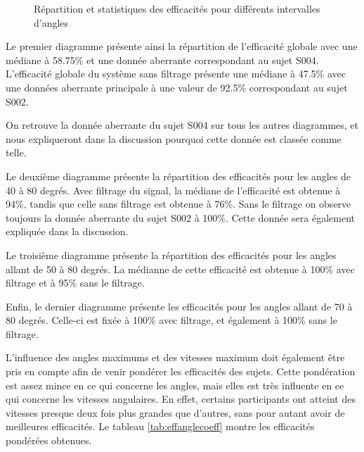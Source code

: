 \documentclass[letterpaper, twoside, 12pt, memoire, creativecommons, hyperref]{thETS}
\begin{document}
\begin{figure}
	\centering
	\caption{Répartition et statistiques des efficacités pour différents intervalles d'angles}
	\label{fig:effstats}
\end{figure}

Le premier diagramme présente ainsi la répartition de l'efficacité globale avec une médiane à 58.75\% et une donnée aberrante correspondant au sujet S004. L'efficacité globale du système sans filtrage présente une médiane à 47.5\% avec une données aberrante principale à une valeur de 92.5\% correspondant au sujet S002.

On retrouve la donnée aberrante du sujet S004 sur tous les autres diagrammes, et nous expliqueront dans la discussion pourquoi cette donnée est classée comme telle. 

Le deuxième diagramme présente la répartition des efficacités pour les angles de 40 à 80 degrés. Avec filtrage du signal, la médiane de l'efficacité est obtenue à 94\%, tandis que celle sans filtrage est obtenue à 76\%. Sans le filtrage on observe toujours la donnée aberrante du sujet S002 à 100\%. Cette donnée sera également expliquée dans la discussion.

Le troisième diagramme présente la répartition des efficacités pour les angles allant de 50 à 80 degrés. La médianne de cette efficacité est obtenue à 100\% avec filtrage et à 95\% sans le filtrage. 

Enfin, le dernier diagramme présente les efficacités pour les angles allant de 70 à 80 degrés. Celle-ci est fixée à 100\% avec filtrage, et également à 100\% sans le filtrage.

L'influence des angles maximums et des vitesses maximum doit également être pris en compte afin de venir pondérer les efficacités des sujets. Cette pondération est assez mince en ce qui concerne les angles, mais elles est très influente en ce qui concerne les vitesses angulaires. En effet, certains participants ont atteint des vitesses presque deux fois plus grandes que d'autres, sans pour autant avoir de meilleures efficacités. Le tableau \ref{tab:effanglecoeff} montre les efficacités pondérées obtenues.
\end{document}
